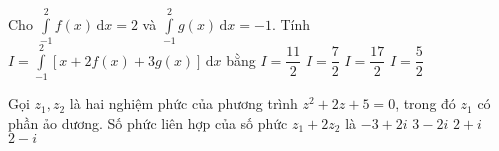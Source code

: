 \begin{ex}%
Cho $ \displaystyle \int \limits^2_{-1} f(x) \mathrm{\, d}x = 2 $ và $ \displaystyle \int \limits^2_{-1} g(x) \mathrm{\, d}x = -1 $. Tính $ I =  \displaystyle \int \limits^2_{-1} \left [ x + 2 f(x) + 3 g(x) \right ] \mathrm{\, d}x  $ bằng	
	\choice
	{$ I = \dfrac{11}{2} $}
	{$ I = \dfrac{7}{2} $}
	{$ I = \dfrac{17}{2} $}
	{\True $ I = \dfrac{5}{2} $}
\end{ex}
\begin{ex}%
Gọi $ z_1, z_2 $ là hai nghiệm phức của phương trình $ z^2 + 2z +5 =0 $, trong đó $ z_1 $ có phần ảo dương. Số phức liên hợp của số phức $ z_1 + 2 z_2 $ là	
	\choice
	{\True $ -3 + 2i $}
	{$ 3 - 2i $}
	{$ 2 + i $}
	{$ 2 - i  $}
\end{ex}
